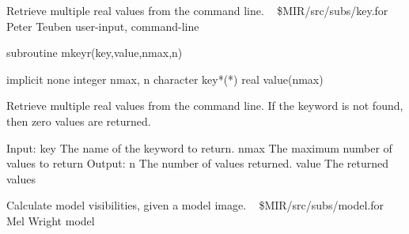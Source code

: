 %
\noindent Retrieve multiple real values from the command line.
\newline \ 
\newline {} \$MIR/src/subs/key.for
\newline {} Peter Teuben
\newline {} user-input, command-line
\par{\tenpoint
{\eightpoint\begintt
        subroutine mkeyr(key,value,nmax,n)

        implicit none
        integer nmax, n
        character key*(*)
        real value(nmax)

  Retrieve multiple real values from the command line. If the keyword is
  not found, then zero values are returned. 

  Input:
    key        The name of the keyword to return.
    nmax       The maximum number of values to return
  Output:
    n          The number of values returned.
    value      The returned values
\endtt}
\par}
%
\noindent Calculate model visibilities, given a model image.
\newline \ 
\newline {} \$MIR/src/subs/model.for
\newline {} Mel Wright
\newline \abox{Keywords:} model

